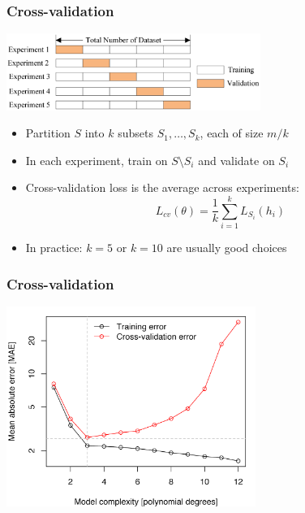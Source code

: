 \documentclass[10pt]{beamer}
\begin{document}
\begin{frame}
  \frametitle{Cross-validation}
  \begin{center}
  \includegraphics[height=2.5cm]{images/cross.png}
  \end{center}
  \begin{itemize}
	\item Partition $S$ into $k$ subsets $S_1,\ldots,S_k$, each of size $m/k$
	\item In each experiment, train on $S\setminus S_i$ and validate on $S_i$
	\item {\color{red} Cross-validation loss} is the average across experiments:
	\[L_{cv}(\theta)=\frac 1 k \sum_{i=1}^k L_{S_i}(h_i)\]
	\item {\color{green} In practice}: $k=5$ or $k=10$ are usually good choices
  \end{itemize}
\end{frame}

\begin{frame}
  \frametitle{Cross-validation}
  \begin{center}
  \includegraphics[height=6.5cm]{images/crosserr.png}
  \end{center}
\end{frame}
\end{document}

